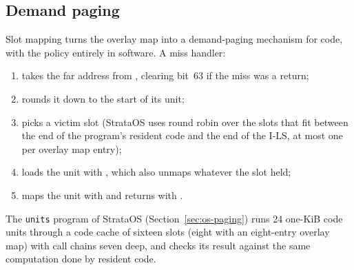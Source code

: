 \subsection{Demand paging}

Slot mapping turns the overlay map into a demand-paging mechanism for code, with the policy entirely in
software. A miss handler:
\begin{enumerate}
\item takes the far address from , clearing bit~63 if the miss was a return;
\item rounds it down to the start of its unit;
\item picks a victim slot (StrataOS uses round robin over the slots that fit between the end of the
  program's resident code and the end of the I-LS, at most one per overlay map entry);
\item loads the unit with , which also unmaps whatever the slot held;
\item maps the unit with  and returns with .
\end{enumerate}
The \texttt{units} program of StrataOS (Section~\ref{sec:os-paging}) runs 24 one-KiB code units through
a code cache of sixteen slots (eight with an eight-entry overlay map) with call chains seven deep, and
checks its result against the same computation done by resident code.
